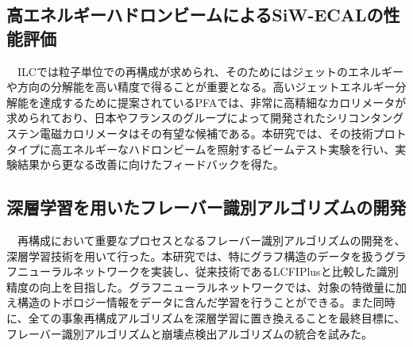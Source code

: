 \subsection{高エネルギーハドロンビームによるSiW-ECALの性能評価}
　ILCでは粒子単位での再構成が求められ、そのためにはジェットのエネルギーや方向の分解能を高い精度で得ることが重要となる。高いジェットエネルギー分解能を達成するために提案されているPFAでは、非常に高精細なカロリメータが求められており、日本やフランスのグループによって開発されたシリコンタングステン電磁カロリメータはその有望な候補である。本研究では、その技術プロトタイプに高エネルギーなハドロンビームを照射するビームテスト実験を行い、実験結果から更なる改善に向けたフィードバックを得た。\\
\subsection{深層学習を用いたフレーバー識別アルゴリズムの開発}
　再構成において重要なプロセスとなるフレーバー識別アルゴリズムの開発を、深層学習技術を用いて行った。本研究では、特にグラフ構造のデータを扱うグラフニューラルネットワークを実装し、従来技術であるLCFIPlusと比較した識別精度の向上を目指した。グラフニューラルネットワークでは、対象の特徴量に加え構造のトポロジー情報をデータに含んだ学習を行うことができる。また同時に、全ての事象再構成アルゴリズムを深層学習に置き換えることを最終目標に、フレーバー識別アルゴリズムと崩壊点検出アルゴリズムの統合を試みた。